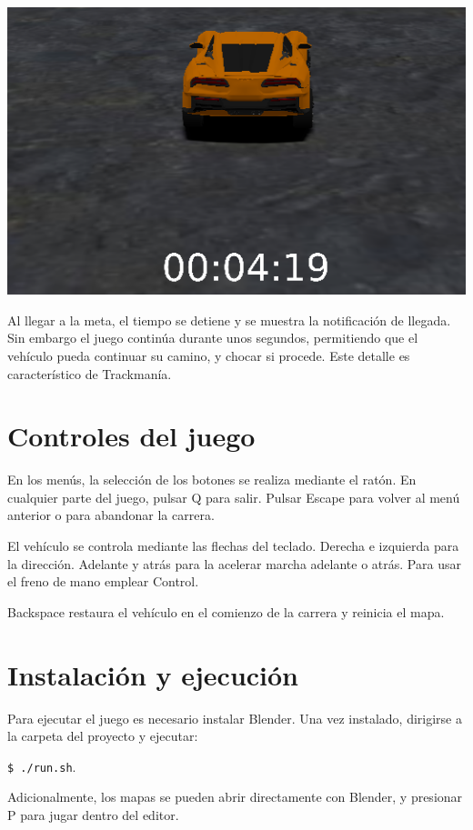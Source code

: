 \documentclass[11pt,a4paper,hidelinks]{article}
\begin{document}
\begin{center}
\includegraphics[scale=0.5]{hud}
\end{center}

Al llegar a la meta, el tiempo se detiene y se muestra la notificación de 
llegada. Sin embargo el juego continúa durante unos segundos, permitiendo que el 
vehículo pueda continuar su camino, y chocar si procede. Este detalle es 
característico de Trackmanía.

\section{Controles del juego}
En los menús, la selección de los botones se realiza mediante el ratón. En 
cualquier parte del juego, pulsar Q para salir. Pulsar Escape para volver al
menú anterior o para abandonar la carrera.

El vehículo se controla mediante las flechas del teclado. Derecha e izquierda 
para la dirección. Adelante y atrás para la acelerar marcha adelante o atrás.  
Para usar el freno de mano emplear Control.

Backspace restaura el vehículo en el comienzo de la carrera y reinicia el mapa.

\section{Instalación y ejecución}
Para ejecutar el juego es necesario instalar Blender. Una vez instalado, 
dirigirse a la carpeta del proyecto y ejecutar:

\texttt{\$ ./run.sh}.

Adicionalmente, los mapas se pueden abrir directamente con Blender, y presionar 
P para jugar dentro del editor.
\end{document}
